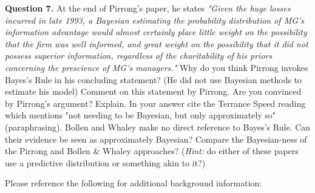 \documentclass[12pt]{article}
\begin{document}
\textbf{Question 7.} At the end of Pirrong's paper, he states \textit{"Given the huge losses incurred in late 1993, a Bayesian estimating the probability distribution of 
MG's information advantage would almost certainly place little weight on the possibility that the firm was well informed, and great weight on the possibility that it did
not possess superior information, regardless of the charitability of his priors concerning the prescience of MG's managers."} Why do you think Pirrong invokes Bayes's Rule
in his concluding statement? (He did not use Bayesian methods to estimate his model) Comment on this statement by Pirrong. Are you convinced by Pirrong's argument? Explain.
In your answer cite the Terrance Speed reading which mentions "not needing to be Bayesian, but only approximately so" (paraphrasing). Bollen and Whaley make no direct reference to Bayes's
Rule. Can their evidence be seen as approximately Bayesian? Compare the Bayesian-ness of the Pirrong and Bollen \& Whaley approaches? (\textit{Hint:} do either of these papers
use a predictive distribution or something akin to it?)

\vspace{10mm}

Please reference the following for additional background information:
\end{document}
